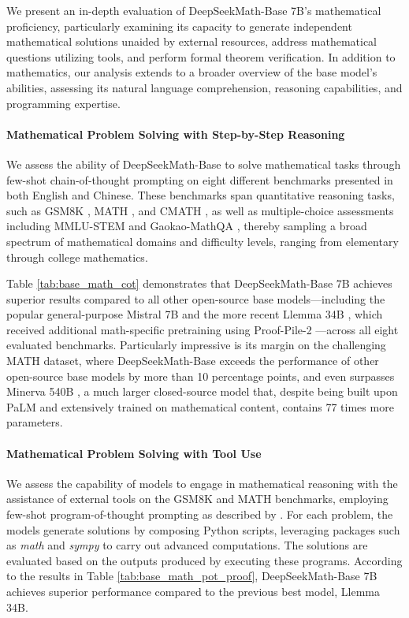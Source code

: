 \begin{itemize}[topsep=0pt]
We present an in-depth evaluation of DeepSeekMath-Base 7B's mathematical proficiency, particularly examining its capacity to generate independent mathematical solutions unaided by external resources, address mathematical questions utilizing tools, and perform formal theorem verification. In addition to mathematics, our analysis extends to a broader overview of the base model’s abilities, assessing its natural language comprehension, reasoning capabilities, and programming expertise.

\paragraph{Mathematical Problem Solving with Step-by-Step Reasoning}

We assess the ability of DeepSeekMath-Base to solve mathematical tasks through few-shot chain-of-thought prompting \citep{cot} on eight different benchmarks presented in both English and Chinese. These benchmarks span quantitative reasoning tasks, such as GSM8K \citep{gsm8k}, MATH \citep{MATH}, and CMATH \citep{wei2023cmath}, as well as multiple-choice assessments including MMLU-STEM \citep{mmlu} and Gaokao-MathQA \citep{agieval}, thereby sampling a broad spectrum of mathematical domains and difficulty levels, ranging from elementary through college mathematics.

Table \ref{tab:base_math_cot} demonstrates that DeepSeekMath-Base 7B achieves superior results compared to all other open-source base models—including the popular general-purpose Mistral 7B \citep{mistral} and the more recent Llemma 34B \citep{llemma}, which received additional math-specific pretraining using Proof-Pile-2 \citep{llemma}—across all eight evaluated benchmarks. Particularly impressive is its margin on the challenging MATH dataset, where DeepSeekMath-Base exceeds the performance of other open-source base models by more than 10 percentage points, and even surpasses Minerva 540B \citep{minerva}, a much larger closed-source model that, despite being built upon PaLM \citep{palm} and extensively trained on mathematical content, contains 77 times more parameters.

\paragraph{Mathematical Problem Solving with Tool Use} We assess the capability of models to engage in mathematical reasoning with the assistance of external tools on the GSM8K and MATH benchmarks, employing few-shot program-of-thought prompting as described by \citet{pot,pal}. For each problem, the models generate solutions by composing Python scripts, leveraging packages such as \textit{math} and \textit{sympy} to carry out advanced computations. The solutions are evaluated based on the outputs produced by executing these programs. According to the results in Table \ref{tab:base_math_pot_proof}, DeepSeekMath-Base 7B achieves superior performance compared to the previous best model, Llemma 34B.


\end{itemize}
